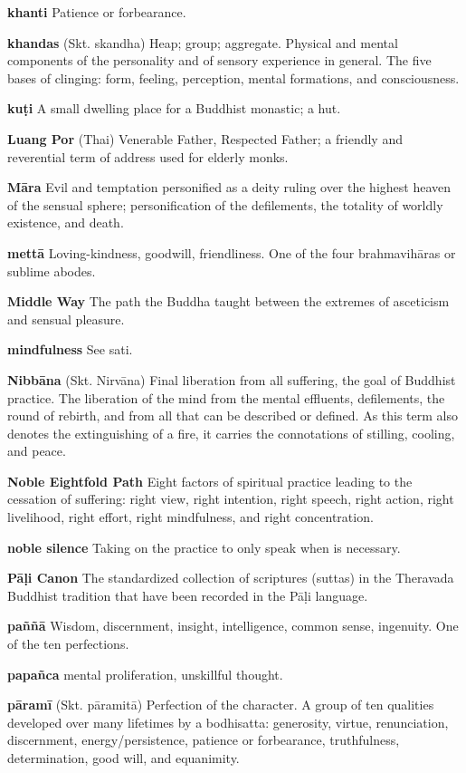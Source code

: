 \textbf{khanti} Patience or forbearance.

\textbf{khandas} (Skt. skandha) Heap; group; aggregate. Physical and 
mental components of the personality and of sensory experience in 
general. The five bases of clinging: form, feeling, perception, mental 
formations, and consciousness.

\textbf{kuṭi} A small dwelling place for a Buddhist monastic; a hut.

\textbf{Luang Por} (Thai) Venerable Father, Respected Father; a 
friendly and reverential term of address used for elderly monks.

\textbf{Māra} Evil and temptation personified as a deity ruling over 
the highest heaven of the sensual sphere; personification of the 
defilements, the totality of worldly existence, and death.

\textbf{mettā} Loving-kindness, goodwill, friendliness. One of the 
four brahmavihāras or sublime abodes.

\textbf{Middle Way} The path the Buddha taught between the extremes of 
asceticism and sensual pleasure.

\textbf{mindfulness} See sati.

\textbf{Nibbāna} (Skt. Nirvāna) Final liberation from all suffering, 
the goal of Buddhist practice. The liberation of the mind from the 
mental effluents, defilements, the round of rebirth, and from all that 
can be described or defined. As this term also denotes the 
extinguishing of a fire, it carries the connotations of stilling, 
cooling, and peace.

\textbf{Noble Eightfold Path} Eight factors of spiritual practice 
leading to the cessation of suffering: right view, right intention, 
right speech, right action, right livelihood, right effort, right 
mindfulness, and right concentration.

\textbf{noble silence} Taking on the practice to only speak when is 
necessary.

\textbf{Pāḷi Canon} The standardized collection of scriptures 
(suttas) in the Theravada Buddhist tradition that have been recorded in 
the Pāḷi language.

\textbf{paññā} Wisdom, discernment, insight, intelligence, common 
sense, ingenuity. One of the ten perfections.

\textbf{papañca} mental proliferation, unskillful thought.

\textbf{pāramī} (Skt. pāramitā) Perfection of the character. A 
group of ten qualities developed over many lifetimes by a bodhisatta: 
generosity, virtue, renunciation, discernment, energy/persistence, 
patience or forbearance, truthfulness, determination, good will, and 
equanimity.

